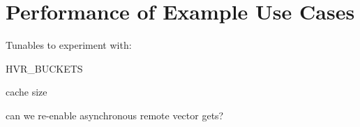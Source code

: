 \section{Performance of Example Use Cases}

Tunables to experiment with:

HVR\_BUCKETS

cache size

can we re-enable asynchronous remote vector gets?
